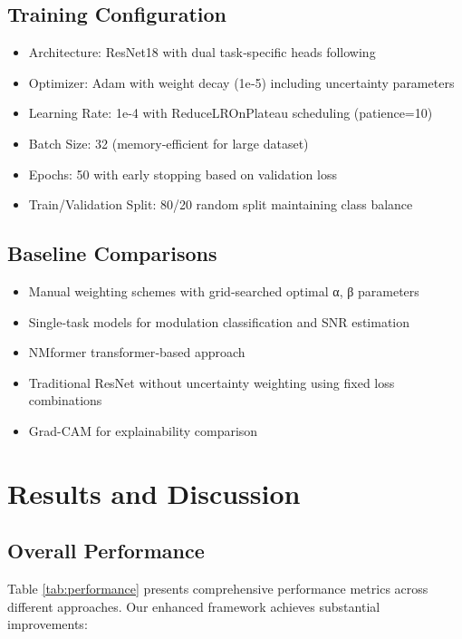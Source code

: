 \documentclass{ELSP}
\begin{document}
\subsection{Training Configuration}
\begin{itemize}
\item Architecture: ResNet18 with dual task‑specific heads following \cite{kumar2023automatic}
\item Optimizer: Adam with weight decay (1e‑5) including uncertainty parameters
\item Learning Rate: 1e‑4 with ReduceLROnPlateau scheduling (patience=10)
\item Batch Size: 32 (memory‑efficient for large dataset)
\item Epochs: 50 with early stopping based on validation loss
\item Train/Validation Split: 80/20 random split maintaining class balance
\end{itemize}

\subsection{Baseline Comparisons}
\begin{itemize}
\item Manual weighting schemes with grid‑searched optimal α, β parameters
\item Single‑task models for modulation classification and SNR estimation
\item NMformer transformer‑based approach \cite{faysal2024nmformer}
\item Traditional ResNet without uncertainty weighting using fixed loss combinations
\item Grad-CAM \cite{selvaraju2017grad} for explainability comparison
\end{itemize}

\section{Results and Discussion}

\subsection{Overall Performance}

Table \ref{tab:performance} presents comprehensive performance metrics across different approaches. Our enhanced framework achieves substantial improvements:
\end{document}
